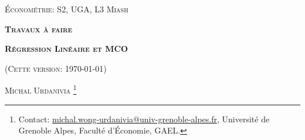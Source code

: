 

\usepackage{tikz}
\usepackage{enumitem}


\usepackage{fancyhdr}
\pagestyle{fancy}
\fancyhead{}
\fancyfoot{} 
\fancyfoot[C]{\small{\thepage}}
\renewcommand{\footrulewidth}{0pt}



 
\usetikzlibrary{positioning}
\usetikzlibrary{snakes}
\usetikzlibrary{calc}
\usetikzlibrary{arrows}
\usetikzlibrary{decorations.markings}
\usetikzlibrary{shapes.misc}
\usetikzlibrary{shapes}

\begin{titlepage}
\centering
	{\scshape\Large \textsc{Économétrie: S2, UGA, L3 Miash}\par}
	\vspace{1cm}
	{\Large\bfseries \textsc{Travaux à faire} \par}
    \vspace{1cm}   
	{\Large\bfseries \textsc{Régression Linéaire et MCO} \par}
	\vspace{1cm}
	{(\textsc{Cette version: \today})\par}
	\vspace{1cm}
	{\large \textsc{Michal Urdanivia}
	\footnote{Contact:  
	\href{mailto:michal.wong-urdanivia@univ-grenoble-alpes.fr}{michal.wong-urdanivia@univ-grenoble-alpes.fr}, 
	 Université de Grenoble Alpes,  Faculté d'\'Economie, GAEL.}\par}
	
\end{titlepage}



